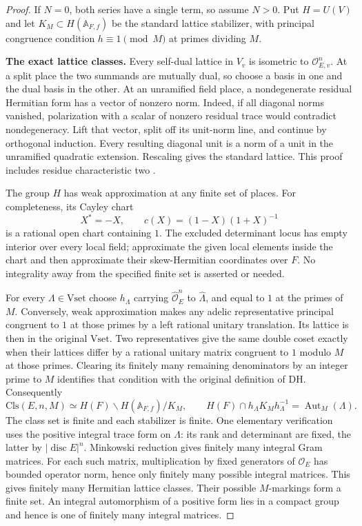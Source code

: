\begin{proof}
If $N=0$, both series have a single term, so assume $N>0$.
Put $H=U(V)$ and let $K_M\subset H(\mathbb A_{F,f})$ be the
standard lattice stabilizer, with principal congruence condition
$h\equiv1\pmod M$ at primes dividing $M$.

\textbf{The exact lattice classes.}
Every self-dual lattice in $V_v$ is isometric to
$\mathcal O_{E,v}^n$. At a split place the two summands are
mutually dual, so choose a basis in one and the dual basis in the
other. At an unramified field place, a nondegenerate residual
Hermitian form has a vector of nonzero norm. Indeed, if all
diagonal norms vanished, polarization with a scalar of nonzero
residual trace would contradict nondegeneracy. Lift that vector,
split off its unit-norm line, and continue by orthogonal
induction. Every resulting diagonal unit is a norm of a unit in
the unramified quadratic extension. Rescaling gives the standard
lattice. This proof includes residue characteristic two
\cite{actual-sw-unit-norms}.

The group $H$ has weak approximation at any finite set of places.
For completeness, its Cayley chart
\[
             X^*=-X,\qquad c(X)=(1-X)(1+X)^{-1}
\]
is a rational open chart containing $1$. The excluded determinant
locus has empty interior over every local field; approximate the
given local elements inside the chart and then approximate their
skew-Hermitian coordinates over $F$. No integrality away from the
specified finite set is asserted or needed.

For every $\Lambda\in\mathrm{Vset}$ choose $h_\Lambda$ carrying
$\widehat{\mathcal O}_E^n$ to $\widehat\Lambda$, and equal to $1$
at the primes of $M$. Conversely, weak approximation makes any
adelic representative principal congruent to $1$ at those primes
by a left rational unitary translation. Its lattice is then in
the original $\mathrm{Vset}$. Two representatives give the same
double coset exactly when their lattices differ by a rational
unitary matrix congruent to $1$ modulo $M$ at those primes.
Clearing its finitely many remaining denominators by an integer
prime to $M$ identifies that condition with the original
definition of $\mathrm{DH}$. Consequently
\begin{equation}\label{actual-sw-class-bijection}
 \mathrm{Cls}(E,n,M)\simeq
              H(F)\backslash H(\mathbb A_{F,f})/K_M,
 \qquad
 H(F)\cap h_\Lambda K_Mh_\Lambda^{-1}
                  =\operatorname{Aut}_M(\Lambda).
\end{equation}
The class set is finite and each stabilizer is finite. One
elementary verification uses the positive integral trace form on
$\Lambda$: its rank and determinant are fixed, the latter by
$|\operatorname{disc}E|^n$. Minkowski reduction gives finitely many
integral Gram matrices. For each such matrix, multiplication by
fixed generators of $\mathcal O_E$ has bounded operator norm,
hence only finitely many possible integral matrices. This gives
finitely many Hermitian lattice classes. Their possible
$M$-markings form a finite set. An integral automorphism of a
positive form lies in a compact group and hence is one of
finitely many integral matrices.


\end{proof}
